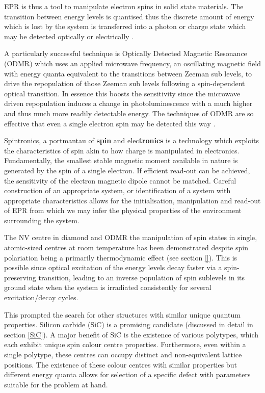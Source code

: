 EPR is thus a tool to manipulate electron spins in solid state materials. The transition between energy levels is quantised thus the discrete amount of energy which is lost by the system is transferred into a photon or charge state which may be detected optically or electrically \cite{carrington1967introduction}.

A particularly successful technique is Optically Detected Magnetic Resonance (ODMR) which uses an applied microwave frequency, an oscillating magnetic field with energy quanta equivalent to the transitions between Zeeman sub levels, to drive the repopulation of those Zeeman sub levels following a spin-dependent optical transition.
In essence this boosts the sensitivity since the microwave driven repopulation induces a change in photoluminescence with a much higher and thus much more readily detectable energy. The techniques of ODMR are so effective that even a single electron spin may be detected this way \cite{Khler1993}.

Spintronics, a portmantau of \textbf{spin} and elec\textbf{tronics} is a technology which exploits the characteristics of spin akin to how charge is manipulated in electronics. Fundamentally, the smallest stable magnetic moment available in nature is generated by the spin of a single electron. If efficient read-out can be achieved, the sensitivity of the electron magnetic dipole cannot be matched. 
Careful construction of an appropriate system, or identification of a system with appropriate characteristics allows for the initialisation, manipulation and read-out of EPR from which we may infer the physical properties of the environment surrounding the system. 

The NV centre in diamond and ODMR the manipulation of spin states in single, atomic-sized centres at room temperature has been demonstrated despite spin polariation being a primarily thermodynamic effect (see section \ref{}).
This is possible since optical excitation of the energy levels decay faster via a spin-preserving transition, leading to an inverse population of spin sublevels in its ground state when the system is irradiated consistently for several excitation/decay cycles.

This prompted the search for other structures with similar unique quantum properties. Silicon carbide (SiC) is a promising candidate (discussed in detail in section \ref{SiC}). A major benefit of SiC is the existence of various polytypes, which each exhibit unique spin colour centre properties. Furthermore, even within a single polytype, these centres can occupy distinct and non-equivalent lattice positions.
The existence of these colour centres with similar properties but different energy quanta allows for selection of a specific defect with parameters suitable for the problem at hand. 

